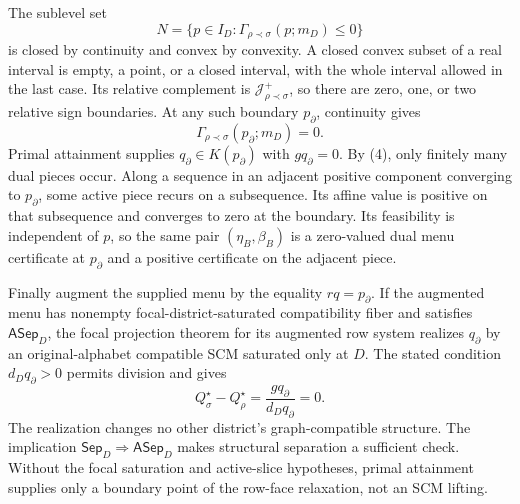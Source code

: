 The sublevel set
\[
N=\{p\in I_D:\Gamma_{\rho\prec\sigma}(p;m_D)\leq0\}
\]
is closed by continuity and convex by convexity.  A closed convex subset of a real interval is empty, a point, or a closed interval, with the whole interval allowed in the last case.  Its relative complement is \(\mathcal J_{\rho\prec\sigma}^+\), so there are zero, one, or two relative sign boundaries.  At any such boundary \(p_\partial\), continuity gives
\[
\Gamma_{\rho\prec\sigma}(p_\partial;m_D)=0.
\]
Primal attainment supplies \(q_\partial\in K(p_\partial)\) with \(gq_\partial=0\).  By (4), only finitely many dual pieces occur.  Along a sequence in an adjacent positive component converging to \(p_\partial\), some active piece recurs on a subsequence.  Its affine value is positive on that subsequence and converges to zero at the boundary.  Its feasibility is independent of \(p\), so the same pair \((\eta_B,\beta_B)\) is a zero-valued dual menu certificate at \(p_\partial\) and a positive certificate on the adjacent piece.

Finally augment the supplied menu by the equality \(rq=p_\partial\).  If the augmented menu has nonempty focal-district-saturated compatibility fiber and satisfies \(\mathsf{ASep}_D\), the focal projection theorem for its augmented row system realizes \(q_\partial\) by an original-alphabet compatible SCM saturated only at \(D\).  The stated condition \(d_Dq_\partial>0\) permits division and gives
\[
Q_\sigma^\star-Q_\rho^\star
=\frac{gq_\partial}{d_Dq_\partial}=0.
\]
The realization changes no other district's graph-compatible structure.  The implication \(\mathsf{Sep}_D\Rightarrow\mathsf{ASep}_D\) makes structural separation a sufficient check.  Without the focal saturation and active-slice hypotheses, primal attainment supplies only a boundary point of the row-face relaxation, not an SCM lifting.